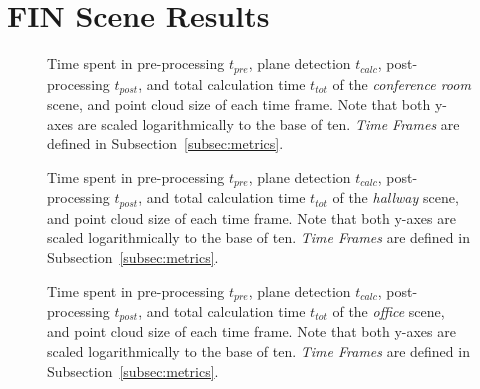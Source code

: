 \documentclass[main.tex]{subfiles}
\begin{document}
\appendix
\chapter{FIN Scene Results}
\label{app:fin}
\setcounter{page}{71}

\begin{figure}[H]
    \centering
    \def\svgwidth{0.7\textwidth}
    
    \caption[Time Results Conference Room Scene]{Time spent in pre-processing $t_{pre}$, plane detection $t_{calc}$, post-processing
        $t_{post}$, and total calculation time $t_{tot}$ of the \textit{conference room} scene, and point cloud size of each time frame.
        Note that both y-axes are scaled logarithmically to the base of ten. \textit{Time Frames} are defined in Subsection~\ref{subsec:metrics}.}
    \label{fig:dynconf}
\end{figure}

\begin{figure}[H]
    \centering
    \def\svgwidth{0.7\textwidth}
    
    \caption[Time Results Hallway Scene]{Time spent in pre-processing $t_{pre}$, plane detection $t_{calc}$, post-processing
        $t_{post}$, and total calculation time $t_{tot}$ of the \textit{hallway} scene, and point cloud size of each time frame.
        Note that both y-axes are scaled logarithmically to the base of ten. \textit{Time Frames} are defined in Subsection~\ref{subsec:metrics}.}
    \label{fig:dynhallway}
\end{figure}

\begin{figure}[p]
    \centering
    \def\svgwidth{0.7\textwidth}
    
    \caption[Time Results Office Scene]{Time spent in pre-processing $t_{pre}$, plane detection $t_{calc}$, post-processing
        $t_{post}$, and total calculation time $t_{tot}$ of the \textit{office} scene, and point cloud size of each time frame.
        Note that both y-axes are scaled logarithmically to the base of ten. \textit{Time Frames} are defined in Subsection~\ref{subsec:metrics}.}
    \label{fig:dynoff}
\end{figure}
\end{document}
